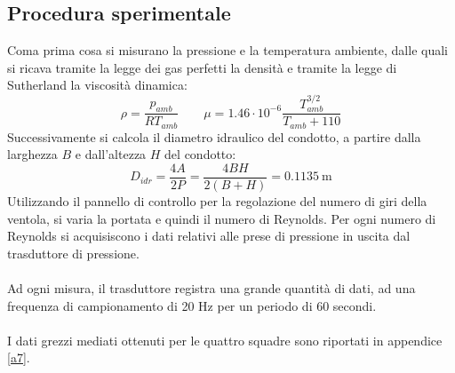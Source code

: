 \newpage
\subsection{Procedura sperimentale}
Coma prima cosa si misurano la pressione e la temperatura ambiente, dalle quali si ricava tramite la legge dei gas perfetti la densità e tramite la legge di Sutherland la viscosità dinamica:
\begin{equation*}
    \rho = \frac{p_{amb}}{RT_{amb}} \qquad \mu = 1.46\cdot10^{-6} \frac{T_{amb}^{3/2}}{T_{amb}+110} 
\end{equation*}
Successivamente si calcola il diametro idraulico del condotto, a partire dalla larghezza $B$ e dall'altezza $H$ del condotto:
\begin{equation*}
    D_{idr} = \frac{4A}{2P} = \frac{4BH}{2(B+H)} = 0.1135\ \text{m}
\end{equation*}
Utilizzando il pannello di controllo per la regolazione del numero di giri della ventola, si varia la portata e quindi il numero di Reynolds. Per ogni numero di Reynolds si acquisiscono i dati relativi alle prese di pressione in uscita dal trasduttore di pressione.\\\\
Ad ogni misura, il trasduttore registra una grande quantità di dati, ad una frequenza di campionamento di 20 Hz per un periodo di 60 secondi.\\\\
I dati grezzi mediati ottenuti per le quattro squadre sono riportati in appendice \ref{a7}.

